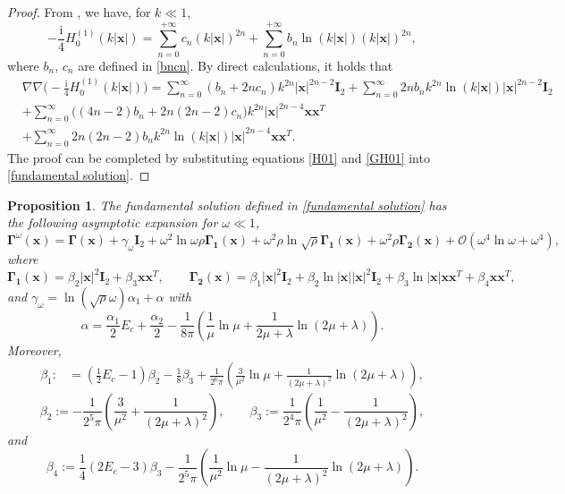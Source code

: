 \documentclass[10pt,reqno,oneside]{amsart}%
\newtheorem{prop}{Proposition}[section]
\theoremstyle{definition}
\theoremstyle{remark}
\numberwithin{equation}{section}
\numberwithin{equation}{section}
\begin{document}
\begin{proof}
From \cite{Minnaertresonances}, we have, for $k\ll1$,
\begin{equation}\label{H01}
-\frac{\mathrm{i}}{4}H_0^{(1)}(k|\mathbf{x}|)=\sum_{n=0}^{+\infty}c_n(k|\mathbf{x}|)^{2n}+\sum_{n=0}^{+\infty}b_n\ln(k|\mathbf{x}|)(k|\mathbf{x}|)^{2n},
\end{equation}
where $b_{n}$, $c_{n}$ are defined in \eqref{bncn}. By direct calculations, it holds that
\begin{align}\label{GH01}
&\nabla\nabla\Big(-\frac{\mathrm{i}}{4}H_0^{(1)}(k|\mathbf{x}|)\Big)=\sum_{n=0}^\infty(b_n+2nc_n)k^{2n}|\mathbf{x}|^{2n-2}\mathbf{I}_2+\sum_{n=0}^\infty2nb_nk^{2n}\ln(k|\mathbf{x}|)|\mathbf{x}|^{2n-2}\mathbf{I}_2\nonumber\\
&+\sum_{n=0}^\infty\Big((4n-2)b_n+2n(2n-2)c_n\Big)k^{2n}|\mathbf{x}|^{2n-4}\mathbf{x}\mathbf{x}^T\nonumber\\
&+\sum_{n=0}^\infty2n(2n-2)b_nk^{2n}\ln(k|\mathbf{x}|)|\mathbf{x}|^{2n-4}\mathbf{x}\mathbf{x}^T.
\end{align}
The proof can be completed by substituting equations \eqref{H01} and \eqref{GH01} into \eqref{fundamental solution}.
\end{proof}
\begin{prop}\label{fundamental solution expansion}
The fundamental solution defined in \eqref{fundamental solution} has the following asymptotic expansion for $\omega\ll1$,
$$
\boldsymbol{\Gamma}^{\omega}(\mathbf{x})=\boldsymbol{\Gamma}(\mathbf{x})+\gamma_{\omega}\mathbf{I}_2+\omega^2\ln\omega\rho\boldsymbol{\Gamma_1}(\mathbf{x})
+\omega^2\rho\ln{\sqrt{\rho}}\boldsymbol{\Gamma_1}(\mathbf{x})
+\omega^2\rho\boldsymbol{\Gamma_2}(\mathbf{x})+ \mathcal{O}(\omega^4\ln{\omega}+\omega^4),
$$
where
$$
\boldsymbol{\Gamma_1}(\mathbf{x})=\beta_2|\mathbf{x}|^{2}\mathbf{I}_2
+\beta_3\mathbf{x}\mathbf{x}^T,\quad \quad \boldsymbol{\Gamma_2}(\mathbf{x})=\beta_1|\mathbf{x}|^{2}\mathbf{I}_2+\beta_2\ln|\mathbf{x}||\mathbf{x}|^{2}\mathbf{I}_2
+\beta_3\ln|\mathbf{x}|\mathbf{x}\mathbf{x}^{T}+\beta_4\mathbf{x}\mathbf{x}^{T},
$$
and $\gamma_{\omega}=\ln (\sqrt{\rho}\omega) \alpha_1+\alpha$ with
$$ \alpha=\frac{\alpha_1}{2}E_c+\frac{\alpha_2}{2}-\frac{1}{8\pi}\left(\frac{1}{\mu}\ln\mu+\frac{1}{2\mu+\lambda}\ln{(2\mu+\lambda)}\right).
$$
Moreover,
\begin{align}
\beta_1:&=\left(\frac{1}{2}E_c-1\right)\beta_2-\frac{1}{8}\beta_3+\frac{1}{2^6\pi}\left(\frac{3}{\mu^2}\ln{\mu} +\frac{1}{(2\mu+\lambda)^2}\ln{(2\mu+\lambda)}\right),\nonumber
\end{align}
$$
\beta_2:=-\frac{1}{2^5\pi}\left(\frac{3}{\mu^2}+\frac{1}{(2\mu+\lambda)^2}\right),\quad \quad \beta_3:=\frac{1}{2^4\pi}\left(\frac{1}{\mu^2}-\frac{1}{(2\mu+\lambda)^2}\right),
$$
and
$$
\beta_4:=\frac{1}{4}\left(2E_c-3\right)\beta_3
-\frac{1}{2^5\pi}\left(\frac{1}{\mu^2}\ln{\mu} -\frac{1}{(2\mu+\lambda)^2}\ln{(2\mu+\lambda)}\right).
$$
\end{prop}
\end{document}
